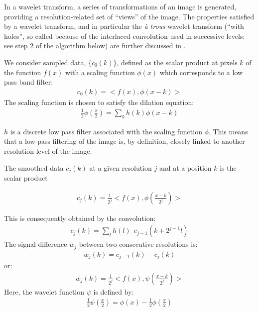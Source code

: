 \documentclass[11pt,a4paper]{article}
\begin{document}
In a wavelet transform, a series of transformations of an image is 
generated, providing a resolution-related set of  ``views'' of the image.  
The properties satisfied by a wavelet transform, and in particular the
{\it \`a trous} wavelet transform (``with holes'', so called because of the 
interlaced
convolution used in successive levels: see step 2 of the algorithm below) 
are further discussed in \cite{starck:book98}. 

We consider sampled data, 
$\{c_0(k)\}$, defined as  the scalar product at 
pixels $k$ of the function $f(x)$ with a scaling function $\phi(x)$
which corresponds to a low pass band filter:
\begin{eqnarray}
c_0(k) = < f(x), \phi(x-k)>
\end{eqnarray}
The scaling function is chosen to satisfy the dilation equation:
\begin{eqnarray}
\frac{1}{2}\phi(\frac{x}{2}) = \sum_k h(k)\phi(x-k)
\end{eqnarray}
 
$h$ is a discrete low pass filter associated with the scaling function
$\phi$.  This means that a low-pass filtering
of the image is, by definition, closely linked to another resolution level
of the image.   
 
The smoothed data $c_j(k)$ at a given resolution $j$ and at a position
$k$  is the scalar product 
 
\begin{eqnarray}
c_j(k)= \frac{1}{2^j}< f(x), \phi(\frac{x-k}{2^j})>
\end{eqnarray}
 
This is consequently obtained by the convolution:
\begin{eqnarray}
c_j(k) = \sum_l h(l) \ \ c_{j-1} (k+2^{j-1}l)
\end{eqnarray}
The signal difference $w_j$ between two consecutive resolutions is:
\begin{eqnarray}
w_j(k) = c_{j-1}(k) - c_j(k) 
\end{eqnarray}
or:
\begin{eqnarray}
w_j(k) = \frac{1}{2^j}< f(x), \psi(\frac{x-k}{2^j})>  
\end{eqnarray}
Here, the wavelet function $\psi$ is defined by:
\begin{eqnarray}
\frac{1}{2}\psi(\frac{x}{2})  = \phi(x) - \frac{1}{2}\phi(\frac{x}{2})
\end{eqnarray}
 
\end{document}
